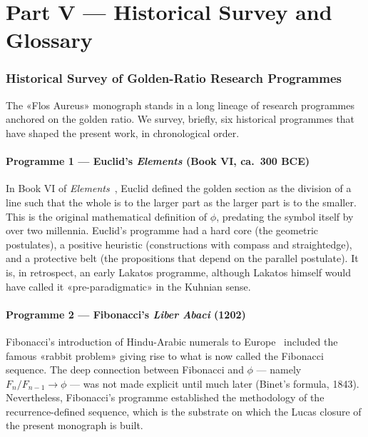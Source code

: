 \part*{Part V — Historical Survey and Glossary}

\section{Historical Survey of Golden-Ratio Research Programmes}
\label{sec:31-historical-survey}

The «Flos Aureus» monograph stands in a long lineage of research programmes anchored on the golden ratio. We survey, briefly, six historical programmes that have shaped the present work, in chronological order.

\subsection{Programme 1 — Euclid's \emph{Elements} (Book VI, ca.\ 300 BCE)}
\label{sec:31-hist-euclid}

In Book VI of \emph{Elements}~\cite{euclid_elements}, Euclid defined the golden section as the division of a line such that the whole is to the larger part as the larger part is to the smaller. This is the original mathematical definition of $\phi$, predating the symbol itself by over two millennia. Euclid's programme had a hard core (the geometric postulates), a positive heuristic (constructions with compass and straightedge), and a protective belt (the propositions that depend on the parallel postulate). It is, in retrospect, an early Lakatos programme, although Lakatos himself would have called it «pre-paradigmatic» in the Kuhnian sense.

\subsection{Programme 2 — Fibonacci's \emph{Liber Abaci} (1202)}
\label{sec:31-hist-fibonacci}

Fibonacci's introduction of Hindu-Arabic numerals to Europe~\cite{fibonacci_liber_abaci} included the famous «rabbit problem» giving rise to what is now called the Fibonacci sequence. The deep connection between Fibonacci and $\phi$ — namely $F_{n}/F_{n-1} \to \phi$ — was not made explicit until much later (Binet's formula, 1843). Nevertheless, Fibonacci's programme established the methodology of the recurrence-defined sequence, which is the substrate on which the Lucas closure of the present monograph is built.

